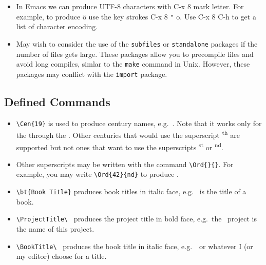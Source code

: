\begin{itemize}
{  \verb| Das astronomische Weltbild gem\"{a}{\ss} j\"{u}ngster Forshung|
  to produce the same thing, e.g.

  Das astronomische Weltbild gem\"{a}{\ss} j\"{u}ngster Forshung.

  This will be useful when creating \LaTeXe\ files from the database
  which is in UTF-8 encoding.
}

\item In Emacs we can produce UTF-8 characters with C-x 8 mark letter.
  For example, to produce ö use the key strokes C-x 8 \verb|"| o. Use
  C-x 8 C-h to get a list of character encoding.
  
\item May wish to consider the use of the \texttt{subfiles} or
  \texttt{standalone} packages if the number of files gets
  large. These packages allow you to precompile files and avoid long
  compiles, simlar to the \texttt{make} command in Unix.  However,
  these packages may conflict with the \texttt{import} package.


\end{itemize}

\subsection{Defined Commands}

\begin{itemize}

\item \verb|\Cen{19}| is used to produce century names,
  e.g.\ . Note that it works only for the  through the
  . Other centuries that would use the superscript
  \textsuperscript{th} are supported but not ones that want to use the
  superscripts \textsuperscript{st} or \textsuperscript{nd}.

\item Other superscripts may be written with the command
  \verb|\Ord{}{}|.  For example, you may write \verb|\Ord{42}{nd}| to
  produce .

\item \verb|\bt{Book Title}| produces book titles in italic face,
e.g.\  is the title of a book.

\item \verb|\ProjectTitle\ | produces the project title in bold face,
  e.g.\ the \ProjectTitle\ project is the name of this project.

\item \verb|\BookTitle\ | produces the book title in italic face,
  e.g.\ \BookTitle\ or whatever I (or my editor) choose for a title.

\end{itemize}

